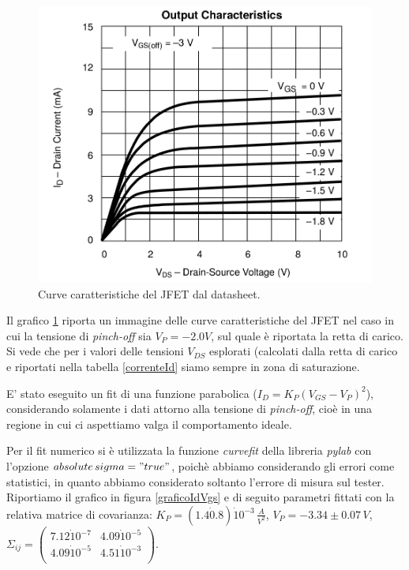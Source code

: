\documentclass[10pt,a4paper]{article}
\begin{document}
\begin{figure}
\centering
\includegraphics[scale=0.4]{char2.png}
\caption{Curve caratteristiche del JFET dal datasheet.\label{curveCaratteristiche}}
\end{figure}

Il grafico \ref{curveCaratteristiche} riporta un immagine delle curve caratteristiche del JFET nel caso in cui la tensione di \emph{pinch-off} sia $V_P = -2.0 V$, sul quale è riportata la retta di carico. Si vede che per i valori delle tensioni $V_{DS}$ esplorati (calcolati dalla retta di carico e riportati nella tabella \ref{correnteId} siamo sempre in zona di saturazione. 

E' stato eseguito un fit di una funzione parabolica ($I_D = K_P (V_{GS} - V_P)^2$), considerando solamente i dati attorno alla tensione di \emph{pinch-off}, cioè in una regione in cui ci aspettiamo valga il comportamento ideale. 

Per il fit numerico si è utilizzata la funzione \emph{curvefit} della libreria \emph{pylab} con l'opzione \emph{$absolute\,sigma = "true"$}, poichè abbiamo considerando gli errori come statistici, in quanto abbiamo considerato soltanto l'errore di misura sul tester. Riportiamo il grafico in figura \ref{graficoIdVgs} e di seguito parametri fittati con la relativa matrice di covarianza: $K_P = (1.4 \dot 0.8) \dot 10^{-3} \, \frac{A}{V^2}$, $V_P = -3.34 \pm 0.07 \, V$,  $ \Sigma_{ij} = \left( \begin{array}{cc}
7.12 \dot 10^{-7} & 4.09 \dot 10^{-5} \\ 
4.09 \dot 10^{-5} & 4.51 \dot 10^{-3}\\
\end{array} \right)$.
\end{document}
